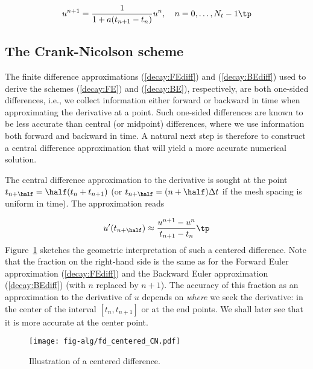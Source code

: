 \documentclass[graybox,sectrefs,envcountresetchap,open=right,final]{svmonodo}
\begin{document}
\begin{equation}
u^{n+1} = \frac{1}{1+ a(t_{n+1}-t_n)} u^n,\quad n=0,\ldots,N_t-1\tp
\label{decay:BE}
\end{equation}

\subsection{The Crank-Nicolson scheme}
\label{decay:schemes:CN}

 


The finite difference approximations
(\ref{decay:FEdiff}) and (\ref{decay:BEdiff}) used to derive the schemes
(\ref{decay:FE}) and (\ref{decay:BE}), respectively,
are both one-sided differences, i.e.,
we collect information either forward or backward in time when approximating
the derivative at a point. Such one-sided differences are
known to be less accurate than central (or midpoint)
differences, where we use information both forward and backward in
time. A natural next step is therefore to construct
a central difference approximation that will yield a more accurate
numerical solution.

The central difference approximation to the derivative is sought at the
point $t_{n+\half}=\half (t_n + t_{n+1})$ (or
$t_{n+\half}=(n+\half)\Delta t$ if the mesh spacing is uniform in time).
The approximation reads

\begin{equation}
u^{\prime}(t_{n+\half}) \approx \frac{u^{n+1}-u^n}{t_{n+1}-t_n}\tp
\label{decay:CNdiff}
\end{equation}
Figure~\ref{decay:sketch:CN} sketches the geometric interpretation of
such a centered difference.
Note that the fraction on the right-hand side is the same as for the
Forward Euler approximation (\ref{decay:FEdiff}) and
the Backward Euler approximation (\ref{decay:BEdiff}) (with
$n$ replaced by $n+1$). The accuracy of this fraction as an approximation
to the derivative of $u$ depends on \emph{where} we seek the derivative:
in the center of the interval $[t_{n},t_{n+1}]$ or at the end points.
We shall later see that it is more accurate at the center point.


\begin{figure}[!ht]  %
  \centerline{\texttt{[image: fig-alg/fd\_centered\_CN.pdf]}}
  \caption{
  Illustration of a centered difference. \label{decay:sketch:CN}
  }
\end{figure}
\end{document}
